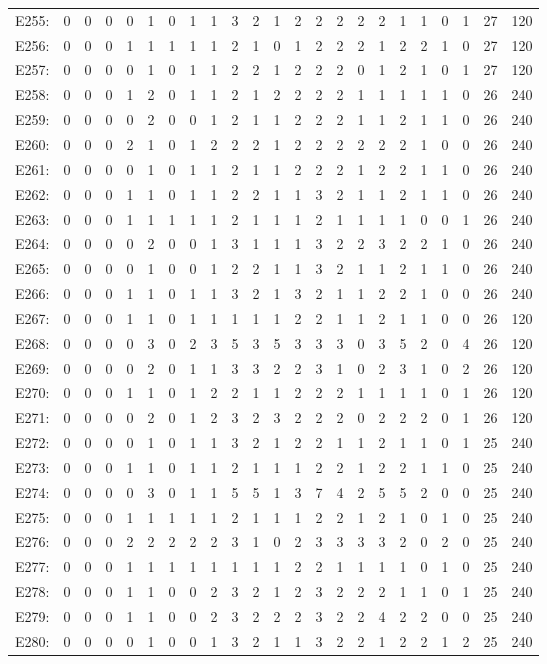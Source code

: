 \documentclass[12pt]{article}
\begin{document}
\begin{center}
\begin{tabular}{ccccccccccccccccccccc|c|c}
E255:&0&0&0&0&1&0&1&1&3&2&1&2&2&2&2&2&1&1&0&1&27&120\\
E256:&0&0&0&1&1&1&1&1&2&1&0&1&2&2&2&1&2&2&1&0&27&120\\
E257:&0&0&0&0&1&0&1&1&2&2&1&2&2&2&0&1&2&1&0&1&27&120\\
E258:&0&0&0&1&2&0&1&1&2&1&2&2&2&2&1&1&1&1&1&0&26&240\\
E259:&0&0&0&0&2&0&0&1&2&1&1&2&2&2&1&1&2&1&1&0&26&240\\
E260:&0&0&0&2&1&0&1&2&2&2&1&2&2&2&2&2&2&1&0&0&26&240\\
E261:&0&0&0&0&1&0&1&1&2&1&1&2&2&2&1&2&2&1&1&0&26&240\\
E262:&0&0&0&1&1&0&1&1&2&2&1&1&3&2&1&1&2&1&1&0&26&240\\
E263:&0&0&0&1&1&1&1&1&2&1&1&1&2&1&1&1&1&0&0&1&26&240\\
E264:&0&0&0&0&2&0&0&1&3&1&1&1&3&2&2&3&2&2&1&0&26&240\\
E265:&0&0&0&0&1&0&0&1&2&2&1&1&3&2&1&1&2&1&1&0&26&240\\
E266:&0&0&0&1&1&0&1&1&3&2&1&3&2&1&1&2&2&1&0&0&26&240\\
E267:&0&0&0&1&1&0&1&1&1&1&1&2&2&1&1&2&1&1&0&0&26&120\\
E268:&0&0&0&0&3&0&2&3&5&3&5&3&3&3&0&3&5&2&0&4&26&120\\
E269:&0&0&0&0&2&0&1&1&3&3&2&2&3&1&0&2&3&1&0&2&26&120\\
E270:&0&0&0&1&1&0&1&2&2&1&1&2&2&2&1&1&1&1&0&1&26&120\\
E271:&0&0&0&0&2&0&1&2&3&2&3&2&2&2&0&2&2&2&0&1&26&120\\
E272:&0&0&0&0&1&0&1&1&3&2&1&2&2&1&1&2&1&1&0&1&25&240\\
E273:&0&0&0&1&1&0&1&1&2&1&1&1&2&2&1&2&2&1&1&0&25&240\\
E274:&0&0&0&0&3&0&1&1&5&5&1&3&7&4&2&5&5&2&0&0&25&240\\
E275:&0&0&0&1&1&1&1&1&2&1&1&1&2&2&1&2&1&0&1&0&25&240\\
E276:&0&0&0&2&2&2&2&2&3&1&0&2&3&3&3&3&2&0&2&0&25&240\\
E277:&0&0&0&1&1&1&1&1&1&1&1&2&2&1&1&1&1&0&1&0&25&240\\
E278:&0&0&0&1&1&0&0&2&3&2&1&2&3&2&2&2&1&1&0&1&25&240\\
E279:&0&0&0&1&1&0&0&2&3&2&2&2&3&2&2&4&2&2&0&0&25&240\\
E280:&0&0&0&0&1&0&0&1&3&2&1&1&3&2&2&1&2&2&1&2&25&240\\
\end{tabular}
\end{center}
\end{document}
